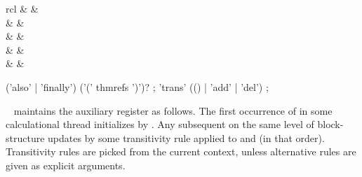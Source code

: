\begin{isabellebody}
\begin{isamarkuptext}
  \begin{matharray}{rcl}
    \hyperlink{command.also}{\mbox{}} & \equiv & \hyperlink{command.note}{\mbox{}}~ \\
    \hyperlink{command.also}{\mbox{}} & \equiv & \hyperlink{command.note}{\mbox{}}~ \\[0.5ex]
    \hyperlink{command.finally}{\mbox{}} & \equiv & \hyperlink{command.also}{\mbox{}}~\hyperlink{command.from}{\mbox{}}~ \\[0.5ex]
    \hyperlink{command.moreover}{\mbox{}} & \equiv & \hyperlink{command.note}{\mbox{}}~ \\
    \hyperlink{command.ultimately}{\mbox{}} & \equiv & \hyperlink{command.moreover}{\mbox{}}~\hyperlink{command.from}{\mbox{}}~ \\
  \end{matharray}

  \begin{rail}
    ('also' | 'finally') ('(' thmrefs ')')?
    ;
    'trans' (() | 'add' | 'del')
    ;
  \end{rail}

  \begin{description}

  \item \hyperlink{command.also}{\mbox{}}~ maintains the auxiliary
  \hyperlink{fact.calculation}{\mbox{}} register as follows.  The first occurrence of
  \hyperlink{command.also}{\mbox{}} in some calculational thread initializes \hyperlink{fact.calculation}{\mbox{}} by \hyperlink{fact.this}{\mbox{}}. Any subsequent \hyperlink{command.also}{\mbox{}} on
  the same level of block-structure updates \hyperlink{fact.calculation}{\mbox{}} by
  some transitivity rule applied to \hyperlink{fact.calculation}{\mbox{}} and \hyperlink{fact.this}{\mbox{}} (in that order).  Transitivity rules are picked from the
  current context, unless alternative rules are given as explicit
  arguments.


\end{description}
\end{isamarkuptext}
\end{isabellebody}
